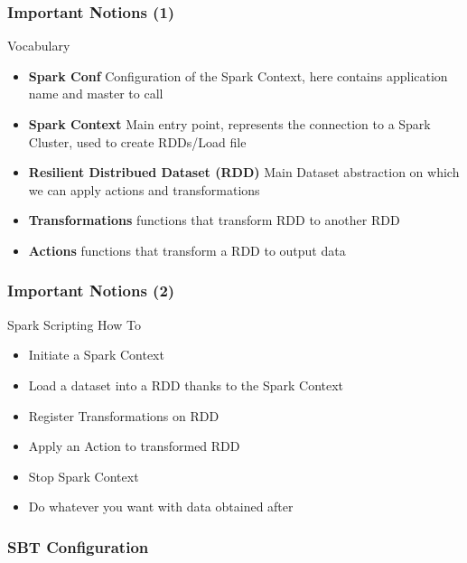 \documentclass[slidetop,9pt,utf8]{beamer}
\begin{document}
\begin{CJK}{UTF8}{gbsn}
\begin{frame}
  \frametitle{Important Notions (1)}

  \begin{block}{Vocabulary}
    \begin{itemize}
      \item \textbf{Spark Conf} Configuration of the Spark Context, here contains application name and master to call
      \item \textbf{Spark Context} Main entry point, represents the connection to a Spark Cluster, used to create RDDs/Load file
      \item \textbf{Resilient Distribued Dataset (RDD)} Main Dataset abstraction on which we can apply actions and transformations
      \item \textbf{Transformations} functions that transform RDD to another RDD
      \item \textbf{Actions} functions that transform a RDD to output data
    \end{itemize}
  \end{block}

\end{frame}

\begin{frame}
  \frametitle{Important Notions (2)}

  \begin{block}{Spark Scripting How To}
    \begin{itemize}
      \item Initiate a Spark Context
      \item Load a dataset into a RDD thanks to the Spark Context
      \item Register Transformations on RDD
      \item Apply an Action to transformed RDD
      \item Stop Spark Context
      \item Do whatever you want with data obtained after 
    \end{itemize}
  \end{block}

\end{frame}

\begin{frame}
  \frametitle{SBT Configuration}

  


\end{frame}
\end{CJK}
\end{document}
